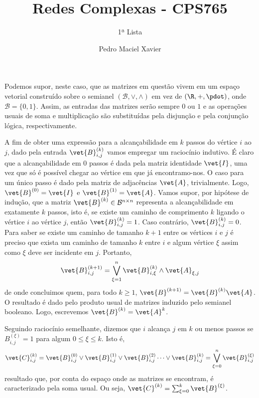 \documentclass[l15]{homework}
\title{Redes Complexas - CPS765}
\subtitle{1ª Lista}
\author{Pedro Maciel Xavier}
\begin{document}
	\maketitle
	\quest{}
	Podemos supor, neste caso, que as matrizes em questão vivem em um espaço vetorial construído sobre o semianel $(\mathcal{B}, \vee, \wedge)$ em vez de $(\R, +, \pdot)$, onde $\mathcal{B} = \{0, 1\}$. Assim, as entradas das matrizes serão sempre $0$ ou $1$ e as operações usuais de soma e multiplicação são substituídas pela disjunção e pela conjunção lógica, respectivamente.
	
	\subsubquest%
	A fim de obter uma expressão para a alcançabilidade em $k$ passos do vértice $i$ ao $j$, dado pela entrada $\vet{B}_{i, j}^{(k)}$ vamos empregar um raciocínio indutivo. É claro que a alcançabilidade em $0$ passos é dada pela matriz identidade $\vet{I}$, uma vez que só é possível chegar ao vértice em que já encontramo-nos. O caso para um único passo é dado pela matriz de adjacências $\vet{A}$, trivialmente. Logo, $\vet{B}^{(0)} = \vet{I}$ e $\vet{B}^{(1)} = \vet{A}$. Vamos supor, por hipótese de indução, que a matriz $\vet{B}^{(k)} \in \mathcal{B}^{n \times n}$ representa a alcançabilidade em exatamente $k$ passos, isto é, se existe um caminho de comprimento $k$ ligando o vértice $i$ ao vértice $j$, então $\vet{B}^{(k)}_{i, j} = 1$. Caso contrário, $\vet{B}^{(k)}_{i, j} = 0$. Para saber se existe um caminho de tamanho $k + 1$ entre os vértices $i$ e $j$ é preciso que exista um caminho de tamanho $k$ entre $i$ e algum vértice $\xi$ assim como $\xi$ deve ser incidente em $j$. Portanto,%
	$$\vet{B}^{(k + 1)}_{i, j} = \bigvee_{\xi = 1}^{n} \vet{B}^{(k)}_{i, \xi} \wedge \vet{A}_{\xi, j}$$
	de onde concluimos quem, para todo $k \ge 1$, $\vet{B}^{(k + 1)}= \vet{B}^{(k)} \vet{A}$. O resultado é dado pelo produto usual de matrizes induzido pelo semianel booleano. Logo, escrevemos $\vet{B}^{(k)} = \vet{A}^{k}$.
	
	\subsubquest%
	Seguindo raciocínio semelhante, dizemos que $i$ alcança $j$ em $k$ ou menos passos se $B^{(\xi)}_{i,j} = 1$ para algum $0 \le \xi \le k$. Isto é,%
	$$\vet{C}_{i, j}^{(k)} = \vet{B}_{i, j}^{(0)} \vee \vet{B}_{i, j}^{(1)} \vee \vet{B}_{i, j}^{(2)} \dots \vee \vet{B}_{i, j}^{(k)} = \bigvee_{\xi = 0}^{n} \vet{B}_{i, j}^{(\xi)}$$
	resultado que, por conta do espaço onde as matrizes se encontram, é caracterizado pela soma usual. Ou seja, $\vet{C}^{(k)} = \sum_{\xi=0}^{k} \vet{B}^{(\xi)}$.
\end{document}
